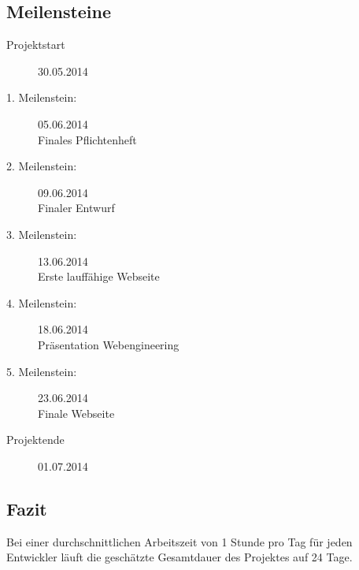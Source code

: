 \newpage
\subsection{Meilensteine}
\begin{description}
	\item[Projektstart] 30.05.2014
	\item[1. Meilenstein:] 05.06.2014\\
	Finales Pflichtenheft
	\item[2. Meilenstein:] 09.06.2014\\
	Finaler Entwurf
	\item[3. Meilenstein:] 13.06.2014\\
	Erste lauffähige Webseite
	\item[4. Meilenstein:] 18.06.2014\\
	Präsentation Webengineering
	\item[5. Meilenstein:] 23.06.2014\\
	Finale Webseite
	\item[Projektende] 01.07.2014
\end{description}

\subsection{Fazit}
Bei einer durchschnittlichen Arbeitszeit von 1 Stunde pro Tag für jeden Entwickler läuft die geschätzte Gesamtdauer des Projektes auf 24 Tage.